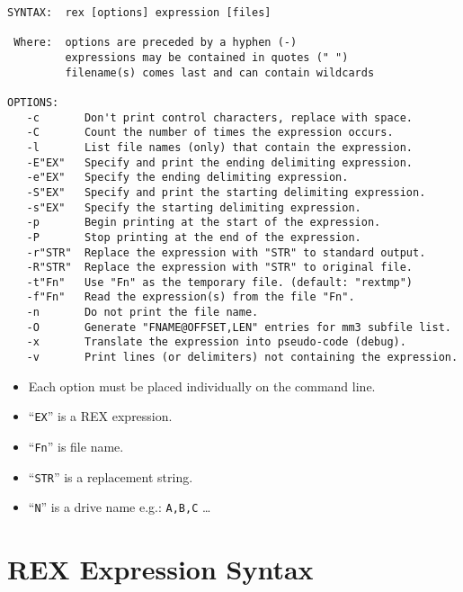\begin{verbatim}
SYNTAX:  rex [options] expression [files]

 Where:  options are preceded by a hyphen (-)
         expressions may be contained in quotes (" ")
         filename(s) comes last and can contain wildcards

OPTIONS:
   -c       Don't print control characters, replace with space.
   -C       Count the number of times the expression occurs.
   -l       List file names (only) that contain the expression.
   -E"EX"   Specify and print the ending delimiting expression.
   -e"EX"   Specify the ending delimiting expression.
   -S"EX"   Specify and print the starting delimiting expression.
   -s"EX"   Specify the starting delimiting expression.
   -p       Begin printing at the start of the expression.
   -P       Stop printing at the end of the expression.
   -r"STR"  Replace the expression with "STR" to standard output.
   -R"STR"  Replace the expression with "STR" to original file.
   -t"Fn"   Use "Fn" as the temporary file. (default: "rextmp")
   -f"Fn"   Read the expression(s) from the file "Fn".
   -n       Do not print the file name.
   -O       Generate "FNAME@OFFSET,LEN" entries for mm3 subfile list.
   -x       Translate the expression into pseudo-code (debug).
   -v       Print lines (or delimiters) not containing the expression.
\end{verbatim}

\begin{itemize}
\item Each option must be placed individually on the command line.

\item ``\verb`EX`'' is a REX expression.

\item ``\verb`Fn`'' is file name.

\item ``\verb`STR`'' is a replacement string.

\item ``\verb`N`'' is a drive name  e.g.: \verb`A,B,C` \ldots
\end{itemize}


\section{REX Expression Syntax}

